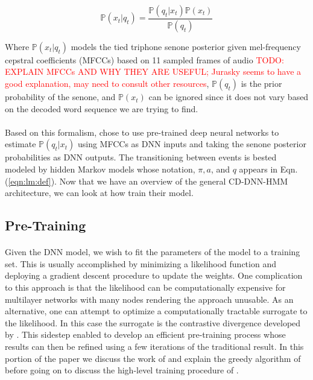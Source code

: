 \documentclass[letterpaper]{article}
\newcommand{\TODO}[1]{\textcolor{red}{TODO: #1}}
\newcommand{\cprob}[2]{ \prob{#1 \lvert #2} }
\newcommand{\prob}[1]{\mathbb{P}\left( #1 \right)}
\begin{document}
\begin{equation*}
	\cprob{x_t}{q_t} = \frac{\cprob{q_t}{x_t} \prob{x_t}}{\prob{q_t}}
	\label{eqn:senone:def}	
\end{equation*}

Where $\cprob{x_t}{q_t}$ models the tied triphone senone posterior given mel-frequency cepstral coefficients (MFCCs) based on 11 sampled frames of audio \TODO{EXPLAIN MFCCs AND WHY THEY ARE USEFUL; Jurasky seems to have a good explanation, may need to consult other resources}, $\prob{q_t}$ is the prior probability of the senone, and $\prob{x_t}$ can be ignored since it does not vary based on the decoded word sequence we are trying to find.

\paragraph{} Based on this formalism, \cite{DBLP:journals/taslp/DahlYDA12} chose to use pre-trained deep neural networks to estimate $\cprob{q_t}{x_t}$ using MFCCs as DNN inputs and taking the senone posterior probabilities as DNN outputs. The transitioning between events is bested modeled by hidden Markov models whose notation, $\pi, a$, and $q$ appears in Eqn. (\ref{eqn:lm:def}). Now that we have an overview of the general CD-DNN-HMM architecture, we can look at how \cite{DBLP:journals/taslp/DahlYDA12} train their model.

\subsection*{Pre-Training}

\paragraph{} Given the DNN model, we wish to fit the parameters of the model to a training set. This is usually accomplished by minimizing a likelihood function and deploying a gradient descent procedure to update the weights. One complication to this approach is that the likelihood can be computationally expensive for multilayer networks with many nodes rendering the approach unusable. As an alternative, one can attempt to optimize a computationally tractable surrogate to the likelihood. In this case the surrogate is the contrastive divergence developed by \cite{DBLP:journals/neco/Hinton02}. This sidestep enabled \cite{DBLP:journals/neco/HintonOT06} to develop an efficient pre-training process whose results can then be refined using a few iterations of the traditional result. In this portion of the paper we discuss the work of \cite{DBLP:journals/neco/Hinton02} and explain the greedy algorithm of \cite{DBLP:journals/neco/HintonOT06} before going on to discuss the high-level training procedure of \cite{DBLP:journals/taslp/DahlYDA12}.
\end{document}

